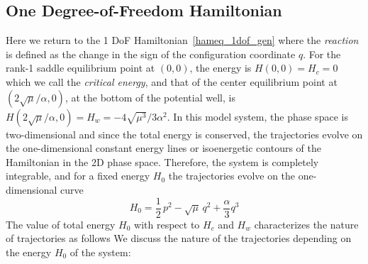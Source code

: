 \documentclass{ws-ijbc}
\begin{document}
\subsection{One Degree-of-Freedom Hamiltonian}
\label{sec:RD_1DOF}

Here we return to the 1 DoF Hamiltonian~\eqref{hameq_1dof_gen} where the {\it reaction} is defined as the change in the sign of the configuration coordinate $q$. 
For the rank-1 saddle equilibrium point at $(0,0)$, the energy is $H(0,0) = H_c = 0$ which we call the \textit{critical energy}, and that of the center equilibrium point at $(2\sqrt{\mu}/\alpha,0)$, at the bottom of the potential well, is $H(2\sqrt{\mu}/\alpha,0) = H_w = - 4 \sqrt{\mu^3}/3 \alpha^2$. In this model system, the phase space is two-dimensional and since the total energy is conserved, the trajectories evolve on the one-dimensional constant energy lines or isoenergetic contours of the Hamiltonian in the 2D phase space. Therefore, the system is completely integrable, and for a fixed energy $H_0$ the trajectories evolve on the one-dimensional curve
\begin{equation}
H_0 = \frac{1}{2} \, p^2 - \sqrt{\mu} \, q^2 + \frac{\alpha}{3} q^3
\end{equation}
The value of total energy $H_0$ with respect to $H_c$ and $H_w$ characterizes the nature of trajectories as follows
We discuss the nature of the trajectories depending on the energy $H_0$ of the system:
\end{document}
